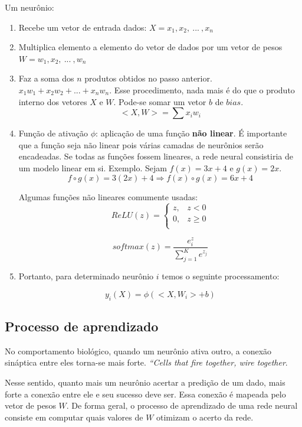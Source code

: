 Um neurônio: 
\begin{enumerate}
	\item Recebe um vetor de entrada dados: $X = x_1, x_2, \ ... \ , x_n$
	\item Multiplica elemento a elemento do vetor de dados por um vetor de pesos $W = w_1, x_2, \ ... \ , w_n$
	
	\item Faz a soma dos $n$ produtos obtidos no passo anterior.
	$ x_1w_1 + x_2w_2 + ... + x_nw_n$. 
	Esse procedimento, nada mais é do que o produto interno dos vetores $X$ e $W$. Pode-se somar um vetor $b$ de $bias$. 
	$$< X, W > = \sum x_i w_i$$
	
	\item Função de ativação $\phi$: aplicação de uma função \textbf{não linear}. 
	É importante que a função seja não linear pois várias camadas de neurônios serão encadeadas. Se todas as funções fossem lineares, a rede neural consistiria de um modelo linear em si. Exemplo. Sejam $f(x) = 3x +4$ e $g(x) = 2x$.
	$$f \circ g (x) = 3(2x) + 4 \Rightarrow f(x) \circ g(x) = 6x + 4$$ 
	
	Algumas funções não lineares comumente usadas: 
	$$ReLU(z) = \begin{cases}
		z, & z < 0 \\
		0, & z \geq 0 \\
	\end{cases}$$
	
	$$softmax(z) = \frac{e^z_i}{\sum_{j = 1}^{K} e^{z_j}}$$
	
	\item Portanto, para determinado neurônio $i$ temos o seguinte processamento: 
	
	$$y_i(X) = \phi(<X, W_i> + b)$$
	
\end{enumerate}

\subsection{Processo de aprendizado}
No comportamento biológico, quando um neurônio ativa outro, a conexão sináptica entre eles torna-se mais forte. \textit{``Cells that fire together, wire together}. 

Nesse sentido, quanto mais um neurônio acertar a predição de um dado, mais forte a conexão entre ele e seu sucesso deve ser. Essa conexão é mapeada pelo vetor de pesos $W$. De forma geral, o processo de aprendizado de uma rede neural consiste em computar quais valores de $W$ otimizam o acerto da rede. 

